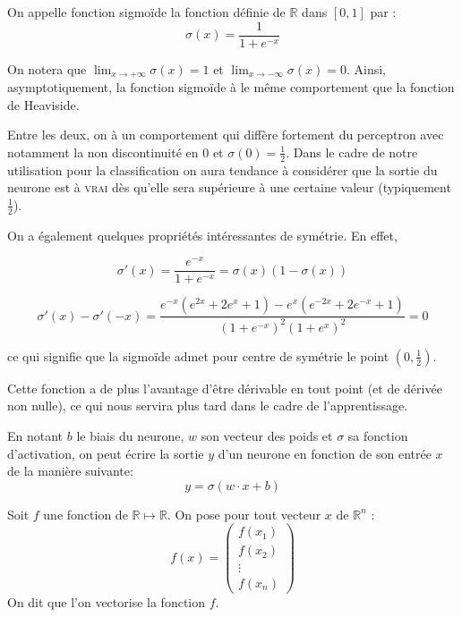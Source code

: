 \begin{definition}
On appelle fonction sigmoïde la fonction définie de $\mathbb{R}$ dans $[0, 1]$ par :
\[
\sigma(x) = \frac{1}{1 + e^{-x}}
\]
\end{definition}

On notera que $\lim_{x \to +\infty} \sigma(x) = 1$ et $\lim_{x \to -\infty} \sigma(x) = 0$. 
Ainsi, asymptotiquement, la fonction sigmoïde à le même comportement que la fonction 
de Heaviside.

Entre les deux, on à un comportement qui diffère fortement du perceptron avec notamment 
la non discontinuité en 0 et $\sigma(0) = \frac{1}{2}$. 
Dans le cadre de notre utilisation pour la classification on aura tendance 
à considérer que la sortie du neurone est à \textsc{vrai} dès qu'elle sera supérieure 
à une certaine valeur (typiquement $\frac{1}{2}$).

On a également quelques propriétés intéressantes de symétrie. En effet,

\[
\sigma'(x) = \frac{e^{-x}}{1 + e^{-x}} = \sigma(x) (1 - \sigma(x))
\]

\[
\sigma'(x) - \sigma'(-x) = \frac{e^{-x}(e^{2x} + 2 e^{x} + 1) - e^{x}(e^{-2x} + 2 e^{-x} + 1)}{(1+e^{-x})^2 (1+e^{x})^2} = 0
\]

ce qui signifie que la sigmoïde admet pour centre de symétrie le point $(0, \frac{1}{2})$.

Cette fonction a de plus l'avantage d'être dérivable en tout point (et de dérivée non nulle), 
ce qui nous servira plus tard dans le cadre de l'apprentissage.


\begin{definition}
En notant $b$ le biais du neurone, $w$ son vecteur des poids et $\sigma$ sa fonction 
d'activation, on peut écrire la sortie $y$ d'un neurone en fonction de son entrée $x$ 
de la manière suivante:
\[
y = \sigma(w \cdot x + b)
\]
\end{definition}


\begin{definition}
Soit $f$ une fonction de $\mathbb{R} \mapsto \mathbb{R}$. 
On pose pour tout vecteur $x$ de $\mathbb{R}^n$ :
\[
f(x) = 
\begin{pmatrix}
f(x_1) \\
f(x_2) \\
\vdots \\
f(x_n)
\end{pmatrix}
\]
On dit que l'on vectorise la fonction $f$.
\end{definition}

